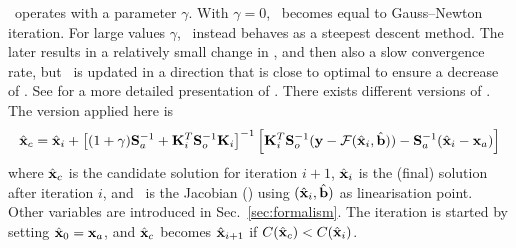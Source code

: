 \LM\ operates with a parameter $\gamma$. With $\gamma=0$, \LM\ becomes equal to
Gauss--Newton iteration. For large values $\gamma$, \LM\ instead behaves as a
steepest descent method. The later results in a relatively small change in
\SttVct, and then also a slow convergence rate, but \SttVct\ is updated in a
direction that is close to optimal to ensure a decrease of \CstFnc. See
\citet[][Sec.~5.7]{rodgers:00} for a more detailed presentation of \LM.
There exists different versions of \LM. The version applied here is
\citep[][Eq.~5.36]{rodgers:00}
\begin{equation}
  \label{eq:ml}
  \hat{\mathbf{x}}_c = \hat{\mathbf{x}}_i + 
  \left[ (1+\gamma)\mathbf{S}_{a}^{-1} + 
          \mathbf{K}_{i}^T\mathbf{S}_{o}^{-1}\mathbf{K}_{i} \right]^{-1}
  \left[ \mathbf{K}_{i}^T\mathbf{S}_{o}^{-1}(\mathbf{y}-\mathcal{F}(\hat{\mathbf{x}}_i,\hat{\mathbf{b}})) -
         \mathbf{S}_{a}^{-1}(\hat{\mathbf{x}}_i-\mathbf{x}_{a})\right]
\end{equation}
where $\hat{\mathbf{x}}_c$ is the candidate solution for iteration $i+1$, $\hat{\mathbf{x}}_i$ is
the (final) solution after iteration $i$, and \ is the Jacobian
(\aWfnMtr{\SttVct}) using $(\hat{\mathbf{x}}_i,\hat{\mathbf{b}})$ as linearisation point.
Other variables are introduced in Sec.~\ref{sec:formalism}. The iteration is
started by setting $\hat{\mathbf{x}}_0 = \mathbf{x}_{a}$, and $\hat{\mathbf{x}}_c$ becomes
$\hat{\mathbf{x}}_{i+1}$ if $C(\hat{\mathbf{x}}_c) < C(\hat{\mathbf{x}}_i)$.

